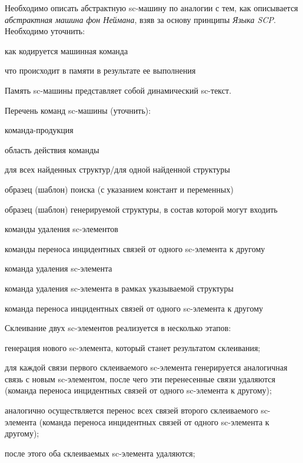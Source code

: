 Необходимо описать абстрактную sc-машину по аналогии с тем, как описывается \textit{абстрактная машина фон Неймана}, взяв за основу принципы \textit{Языка SCP}. Необходимо уточнить:
\begin{textitemize}
	\item как кодируется машинная команда
	\item что происходит в памяти в результате ее выполнения
\end{textitemize}

Память sc-машины представляет собой динамический sc-текст. %

Перечень команд sc-машины (уточнить):
\begin{textitemize}
	\item команда-продукция
	\begin{textitemize}
		\item область действия команды
		\item для всех найденных структур/для одной найденной структуры
		\item образец (шаблон) поиска (с указанием констант и переменных)
		\item образец (шаблон) генерируемой структуры, в состав которой могут входить
		\begin{textitemize}
			\item команды удаления sc-элементов
			\item команды переноса инцидентных связей от одного sc-элемента к другому
		\end{textitemize}
	\end{textitemize}
	\item команда удаления sc-элемента
	\item команда удаления sc-элемента в рамках указываемой структуры %
	\item команда переноса инцидентных связей от одного sc-элемента к другому
\end{textitemize}

Склеивание двух sc-элементов реализуется в несколько этапов:
\begin{textitemize}
	\item генерация нового sc-элемента, который станет результатом склеивания;
	\item для каждой связи первого склеиваемого sc-элемента генерируется аналогичная связь с новым sc-элементом, после чего эти перенесенные связи удаляются (команда переноса инцидентных связей от одного sc-элемента к другому);
	\item аналогично осуществляется перенос всех связей второго склеиваемого sc-элемента (команда переноса инцидентных связей от одного sc-элемента к другому); %
	\item после этого оба склеиваемых sc-элемента удаляются;
\end{textitemize}

